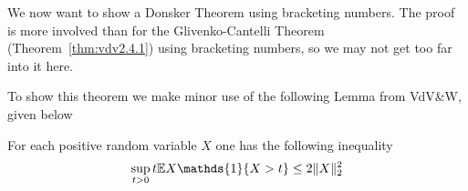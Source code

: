 
We now want to show a Donsker Theorem using bracketing numbers. The proof is more involved than for the Glivenko-Cantelli Theorem (Theorem~\ref{thm:vdv2.4.1}) using bracketing numbers, so we may not get too far into it here. 

To show this theorem we make minor use of the following Lemma from VdV\&W, given below
\begin{lemma}
	\label{lemma:vdv2.5.5}
	For each positive random variable \(X\) one has the following inequality
	\begin{equation*}
		\sup_{t>0}t\E X\mathds{1}\{X > t\} \leq  2 \|X\|_2^2 
	\end{equation*}
\end{lemma}

